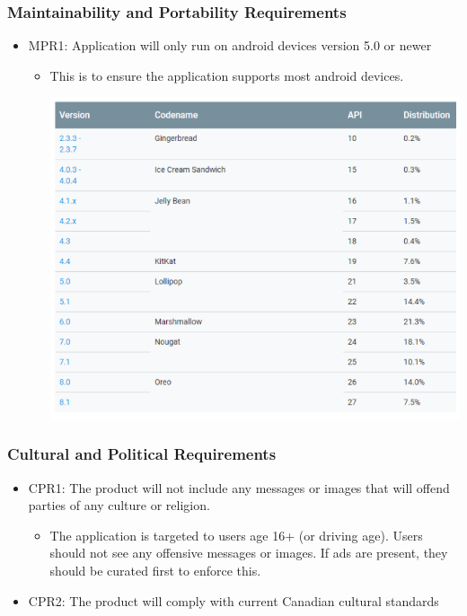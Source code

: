 \documentclass[]{article}
\begin{document}
\subsubsection{Maintainability and Portability Requirements}
\begin{itemize}
	\item MPR1: Application will only run on android devices version 5.0 or newer
	\begin{itemize}
		\item This is to ensure the application supports most android devices.
		\begin{center}
			\includegraphics[width=\textwidth,height=\textheight,keepaspectratio]{mp}
		\end{center}
	\end{itemize}
\end{itemize}
\subsubsection{Cultural and Political Requirements}
\begin{itemize}
	\item CPR1: The product will not include any messages or images that will offend parties of any culture or religion.
	\begin{itemize}
		\item The application is targeted to users age 16+ (or driving age). Users should not see any offensive messages or images. If ads are present, they should be curated first to enforce this.
	\end{itemize}
	
	\item CPR2: The product will comply with current Canadian cultural standards
\end{itemize}
\end{document}
